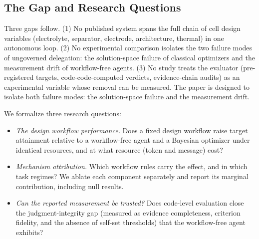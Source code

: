 \subsection{The Gap and Research Questions}

Three gaps follow. (1) No published system spans the full chain of cell
design variables (electrolyte, separator, electrode, architecture,
thermal) in one autonomous loop. (2) No experimental comparison isolates
the two failure modes of ungoverned delegation: the solution-space failure of
classical optimizers and the measurement drift of workflow-free agents. (3)
No study treats the evaluator (pre-registered targets,
code-code-computed verdicts, evidence-chain audits) as an experimental
variable whose removal can be measured. The paper is designed to isolate
both failure modes: the solution-space failure and the measurement drift.

We formalize three research
questions:

\begin{itemize}
\item[\textbf{RQ1}]
\emph{The design workflow performance.} Does a fixed design workflow raise target
attainment relative to a workflow-free agent and a Bayesian optimizer under
identical resources, and at what resource (token and message) cost?
\item[\textbf{RQ2}]
\emph{Mechanism attribution.} Which workflow rules carry the effect,
and in which task regimes? We ablate each component separately and report
its marginal contribution, including null results.
\item[\textbf{RQ3}]
\emph{Can the reported measurement be trusted?} Does code-level evaluation close the
judgment-integrity gap (measured as evidence completeness, criterion
fidelity, and the absence of self-set thresholds) that the workflow-free
agent exhibits?
\end{itemize}
